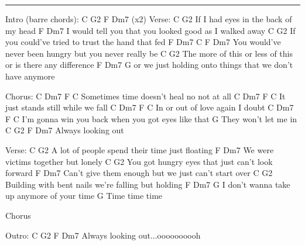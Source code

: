 \noindent\rule{\columnwidth}{1pt}

\begin{lstsong}
Intro (barre chords): C G2 F Dm7 (x2)
Verse:
C                    G2
If I had eyes in the back of my head
        F                                  Dm7
I would tell you that you looked good as I walked away
C                                  G2
If you could've tried to trust the hand that fed
             F                         Dm7               C   F  Dm7
You would've never been hungry but you never really be
    C                               G2
The more of this or less of this or is there any difference
F                       Dm7                          G
or we just holding onto things that we don't have anymore

Chorus:
          C            Dm7  F         C
Sometimes time doesn't heal no not at all
   C           Dm7   F        C
It just stands still while we fall
C     Dm7         F       C
In or out of love again I doubt
          C       Dm7               F         C
I'm gonna win you back when you got eyes like that
                  G
They won't let me in
               C  G2  F  Dm7
Always looking out

Verse:
C                           G2
A lot of people spend their time just floating
F               Dm7
We were victims together but lonely
C                        G2
You got hungry eyes that just can't look forward
      F                       Dm7
Can't give them enough but we just can't start over
C                              G2
Building with bent nails we're falling but holding
F                     Dm7             G
I don't wanna take up anymore of your time
G
Time time time

Chorus

Outro:         C     G2  F  Dm7
Always looking out...oooooooooh
\end{lstsong}
\newpage

\begin{comment}
Outro:
               C     G2  F  Dm7
Always looking out...oooooooooh
               C     G2  F  Dm7
Always looking out...oooooooooh
              C
Always looking out
\end{comment}


